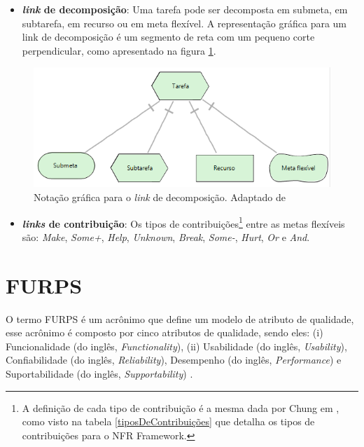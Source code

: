 \begin{itemize}	
	\item \textbf{\textit{link} de decomposição}: Uma tarefa pode ser decomposta em submeta, em subtarefa, em recurso ou em meta flexível. A representação gráfica para um link de decomposição é um segmento de reta com um pequeno corte perpendicular, como apresentado na figura \ref{decomposicaoLink}.    
\end{itemize}	

\begin{figure}[h!]
		\centering
		\includegraphics[keepaspectratio=true,scale=1.0]{figuras/decomposicaoLink.PNG}
		\caption{Notação gráfica para o \textit{link} de decomposição. Adaptado de \cite{istarwiki20}}
		\label{decomposicaoLink}
\end{figure}

\begin{itemize}		
	\item \textbf{\textit{links} de contribuição}: Os tipos de contribuições\footnote[1]{A definição de cada tipo de contribuição é a mesma dada por Chung em \cite{chung2012non}, como visto na tabela \ref{tiposDeContribuições} que detalha os tipos de contribuições para o NFR Framework.} entre as metas flexíveis são: \textit{Make}, \textit{Some+}, \textit{Help}, \textit{Unknown}, \textit{Break}, \textit{Some-}, \textit{Hurt}, \textit{Or} e \textit{And}. 
\end{itemize}


\section{FURPS}
\label{sec:furps}

O termo FURPS é um acrônimo que define um modelo de atributo de qualidade, esse acrônimo é composto por cinco atributos de qualidade, sendo eles: (i) Funcionalidade (do inglês, \textit{Functionality}), (ii) Usabilidade (do inglês, \textit{Usability}), Confiabilidade (do inglês, \textit{Reliability}), Desempenho (do inglês, \textit{Performance}) e Suportabilidade (do inglês, \textit{Supportability}) \cite{umar2011analyzing}.

